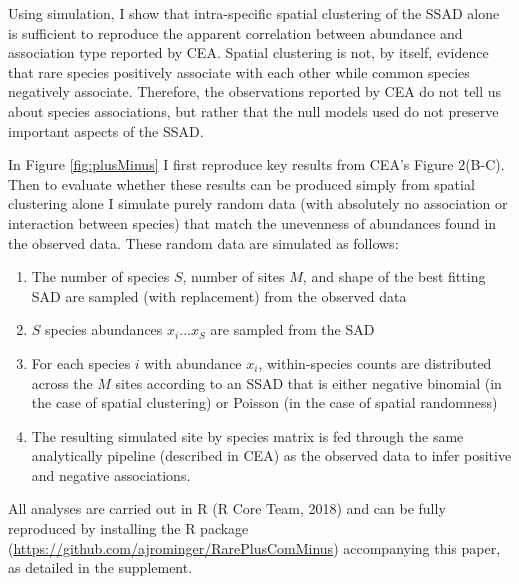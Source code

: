 \documentclass[
]{article}
\providecommand{\tightlist}{%
  \setlength{\itemsep}{0pt}\setlength{\parskip}{0pt}}
\begin{document}
Using simulation, I show that intra-specific spatial clustering of the
SSAD alone is sufficient to reproduce the apparent correlation between
abundance and association type reported by CEA. Spatial clustering is
not, by itself, evidence that rare species positively associate with
each other while common species negatively associate. Therefore, the
observations reported by CEA do not tell us about species associations,
but rather that the null models used do not preserve important aspects
of the SSAD.

In Figure \ref{fig:plusMinus} I first reproduce key results from CEA's
Figure 2(B-C). Then to evaluate whether these results can be produced
simply from spatial clustering alone I simulate purely random data (with
absolutely no association or interaction between species) that match the
unevenness of abundances found in the observed data. These random data
are simulated as follows:

\begin{enumerate}
\def\labelenumi{\arabic{enumi})}
\tightlist
\item
  The number of species \(S\), number of sites \(M\), and shape of the
  best fitting SAD are sampled (with replacement) from the observed data
\item
  \(S\) species abundances \(x_i \ldots x_S\) are sampled from the SAD
\item
  For each species \(i\) with abundance \(x_i\), within-species counts
  are distributed across the \(M\) sites according to an SSAD that is
  either negative binomial (in the case of spatial clustering) or
  Poisson (in the case of spatial randomness)
\item
  The resulting simulated site by species matrix is fed through the same
  analytically pipeline (described in CEA) as the observed data to infer
  positive and negative associations.
\end{enumerate}

All analyses are carried out in R (R Core Team, 2018) and can be fully
reproduced by installing the R package
(\url{https://github.com/ajrominger/RarePlusComMinus}) accompanying this
paper, as detailed in the supplement.
\end{document}
